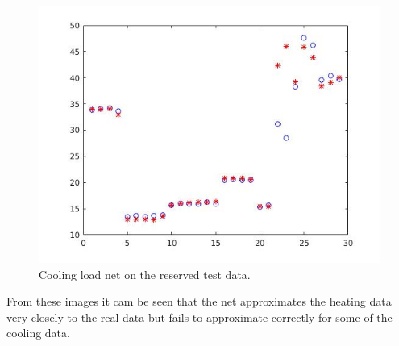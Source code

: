 \documentclass{article}%
\begin{document}
\begin{figure}[H]
\centering
\includegraphics[scale=0.5]{Images/enetest2.jpg}
\caption{Cooling load net on the reserved test data.}
\label{fig:enetest2}
\end{figure}
From these images it cam be seen that the net approximates the heating data very closely to the real data but fails to approximate correctly for some of the cooling data. 
\end{document}
